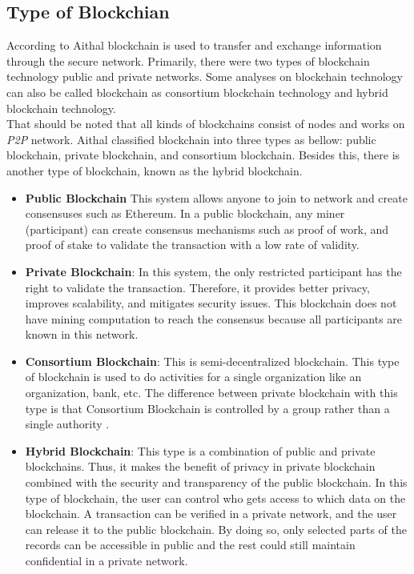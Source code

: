 \subsection{Type of Blockchian}
According to Aithal\cite{Aithal} blockchain is used to transfer and exchange information through the secure network. Primarily, there were two types of blockchain technology public and private networks. Some analyses on blockchain technology can also be called blockchain as consortium blockchain technology and hybrid blockchain technology. \\
That should be noted that all kinds of blockchains consist of nodes and works on \textit{P2P} network. Aithal \cite{Aithal} classified blockchain into three types as bellow: public blockchain, private blockchain, and consortium blockchain. Besides this, there is another type of blockchain, known as the hybrid blockchain.
\begin{itemize}
    \item \textbf{Public Blockchain}
    This system allows anyone to join to network and create consensuses such as Ethereum. In a public blockchain, any miner (participant) can create consensus mechanisms such as proof of work, and proof of stake to validate the transaction with a low rate of validity\cite{Kalra}.
    \item \textbf{Private Blockchain}: In this system, the only restricted participant has the right to validate the transaction. Therefore, it provides better privacy, improves scalability, and mitigates security issues. This blockchain does not have mining computation to reach the consensus because all participants are known in this network\cite{Kalra}. 
    \item \textbf{Consortium Blockchain}: This is semi-decentralized blockchain. This type of blockchain is used to do activities for a single organization like an organization, bank, etc. The difference between private blockchain with this type is that Consortium Blockchain is controlled by a group rather than a single authority \cite{Aithal}.
    \item \textbf{Hybrid Blockchain}: This type is a combination of public and private blockchains. Thus, it makes the benefit of privacy in private blockchain combined with the security and transparency of the public blockchain. In this type of blockchain, the user can control who gets access to which data on the blockchain. A transaction can be verified in a private network, and the user can release it to the public blockchain. By doing so, only selected parts of the records can be accessible in public and the rest could still maintain confidential in a private network\cite{Aithal}. 
\end{itemize}

